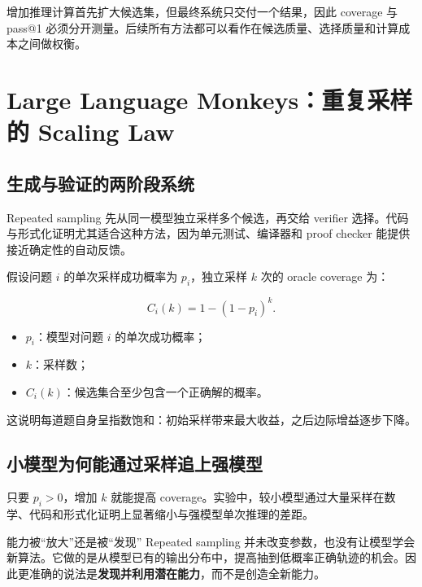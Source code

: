 \documentclass[a4paper]{article}
\begin{document}
增加推理计算首先扩大候选集，但最终系统只交付一个结果，因此 coverage 与 pass@1 必须分开测量。后续所有方法都可以看作在候选质量、选择质量和计算成本之间做权衡。

\section{Large Language Monkeys：重复采样的 Scaling Law}

\subsection{生成与验证的两阶段系统}

Repeated sampling 先从同一模型独立采样多个候选，再交给 verifier 选择。代码与形式化证明尤其适合这种方法，因为单元测试、编译器和 proof checker 能提供接近确定性的自动反馈。


假设问题 $i$ 的单次采样成功概率为 $p_i$，独立采样 $k$ 次的 oracle coverage 为：

$$
C_i(k)=1-(1-p_i)^k.
$$

\begin{itemize}
    \item $p_i$：模型对问题 $i$ 的单次成功概率；
    \item $k$：采样数；
    \item $C_i(k)$：候选集合至少包含一个正确解的概率。
\end{itemize}

这说明每道题自身呈指数饱和：初始采样带来最大收益，之后边际增益逐步下降。

\subsection{小模型为何能通过采样追上强模型}

只要 $p_i>0$，增加 $k$ 就能提高 coverage。实验中，较小模型通过大量采样在数学、代码和形式化证明上显著缩小与强模型单次推理的差距。


\begin{knowledgebox}{能力被“放大”还是被“发现”}
Repeated sampling 并未改变参数，也没有让模型学会新算法。它做的是从模型已有的输出分布中，提高抽到低概率正确轨迹的机会。因此更准确的说法是\textbf{发现并利用潜在能力}，而不是创造全新能力。
\end{knowledgebox}
\end{document}
